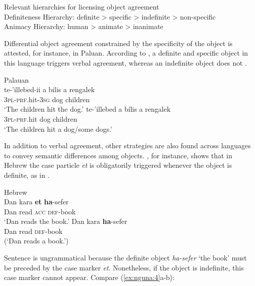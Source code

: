 \documentclass[output=paper]{langsci/langscibook}
\begin{document}
\ea\label{ex:nguna:1}
{Relevant hierarchies for licensing object agreement}\\
\ea\label{ex:nguna:}
  \textup{Definiteness Hierarchy: definite > specific > indefinite > non-specific}\\
\ex 
\textup{Animacy Hierarchy: human > animate > inanimate}\\
\z
\z

Differential object agreement constrained by the specificity of the object is attested, for instance, in Paluan. According to \citet[218]{Woolford2000}, a definite and specific object in this language triggers verbal agreement, whereas an indefinite object does not .

\ea\label{ex:nguna:2} {Palauan {\citep[30]{Georgopoulos1991}}}\\
\ea
\gll te-’illebed-ii             {a bilis}          {a rengalek}\\
     \textsc{3pl-prf}.hit-\textsc{3sg}        {dog}              {children}\\
\glt ‘The children hit the dog.’
\ex
\gll te-’illebed           {a bílis}         {a rengalek}\\
     \textsc{3}{\textsc{pl}}-{\textsc{prf}}.hit         dog             children\\
\glt ‘The children hit a dog/some dogs.’
\z
\z



In addition to verbal agreement, other strategies are also found across languages to convey semantic differences among objects. \citet{Danon2002}, for instance, shows that in Hebrew the case particle {\textit{et}} is obligatorily triggered whenever the object is definite, as in .


\ea\label{ex:nguna:3}
{Hebrew \citep[1]{Danon2002}}\\
\ea
\gll Dan       kara       \textbf{et}       \textbf{ha}-sefer\\
     Dan       read       \textsc{acc}     \textsc{def}-book\\
\glt ‘Dan reads the book.’
\ex\label{ex:nguna:3b}
\gll *Dan       kara              \textbf{ha}-sefer\\
     Dan         read              \textsc{def}-book\\
\glt (‘Dan reads a book.’)
\z
\z



Sentence  is ungrammatical because the definite object {\textit{ha-sefer}} ‘the book’ must be preceded by the case marker {\textit{et}}. Nonetheless, if the object is indefinite, this case marker cannot appear. Compare (\ref{ex:nguna:4}a-b):
\end{document}
